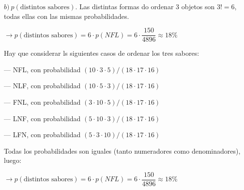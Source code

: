 $b)\ p(\text{distintos sabores})$. Las distintas formas do ordenar 3 objetos son $3!=6$, todas ellas con las mismas probabilidades.

$\to p(\text{distintos sabores})=6\cdot p(NFL)=6\cdot \dfrac{150}{4896}\approx 18\%$

\begin{small}
\vspace{2mm}\textcolor{gris}{Hay que considerar ls siguientes casos de ordenar los tres sabores:}

\textcolor{gris}{--- NFL, con probabilidad $(10\cdot 3 \cdot 5)/(18\cdot 17 \cdot 16)$}

\textcolor{gris}{--- NLF, con probabilidad $(10\cdot 5 \cdot 3)/(18\cdot 17 \cdot 16)$}

\textcolor{gris}{--- FNL, con probabilidad $(3\cdot 10 \cdot 5)/(18\cdot 17 \cdot 16)$}

\textcolor{gris}{--- LNF, con probabilidad $(5\cdot 10 \cdot 3)/(18\cdot 17 \cdot 16)$}

\textcolor{gris}{--- LFN, con probabilidad $(5\cdot 3 \cdot 10)/(18\cdot 17 \cdot 16)$}

\textcolor{gris}{Todas los probabilidades son iguales (tanto numeradores como denominadores), luego:}

\textcolor{gris}{$\to p(\text{distintos sabores})=6\cdot p(NFL)=6\cdot \dfrac{150}{4896}\approx 18\%$}
\end{small}

